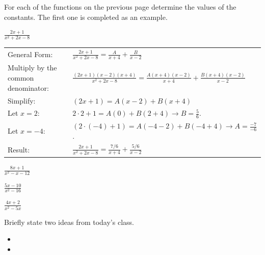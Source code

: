 \begin{problem}
  \item For each of the functions on the previous page determine the values of the constants.
    The first one is completed as an example.
    \begin{subproblem}
      \item ${\displaystyle \frac{2x+1}{x^2+2x-8}}$ \\
      \begin{tabular}{ll}
        General Form: & $\frac{2x+1}{x^2+2x-8}=\frac{A}{x+4} + \frac{B}{x-2}$ \\ [10pt]
        Multiply by the common denominator:  & $\frac{(2x+1)(x-2)(x+4)}{x^2+2x-8}=\frac{A(x+4)(x-2)}{x+4} + \frac{B(x+4)(x-2)}{x-2}$ \\ [10pt]
        Simplify: & $(2x+1)=A(x-2) + B(x+4)$ \\ [10pt]
        Let $x=2$: & $2\cdot 2 + 1 = A(0) + B(2+4) \rightarrow B=\frac{5}{6}$. \\ [10pt]
        Let $x=-4$: & $(2\cdot (-4) + 1) = A(-4-2) + B(-4+4) \rightarrow A=\frac{-7}{-6}$. \\ [10pt]
        Result: & $\frac{2x+1}{x^2+2x-8}=\frac{7/6}{x+4} + \frac{5/6}{x-2}$
      \end{tabular}
      \item ${\displaystyle \frac{8x+1}{x^2-x-12}}$ \\
        \vfill

        \clearpage
      \item ${\displaystyle \frac{5x-10}{x^2-16}}$ \\
        \vfill
      \item ${\displaystyle \frac{4x+2}{x^2-5x}}$ \\
        \vfill
    \end{subproblem}


\end{problem}

\postClass

\begin{problem}
\item Briefly state two ideas from today's class.
  \begin{itemize}
  \item
  \item
  \end{itemize}
\item
  \begin{subproblem}
    \item
  \end{subproblem}
\end{problem}


